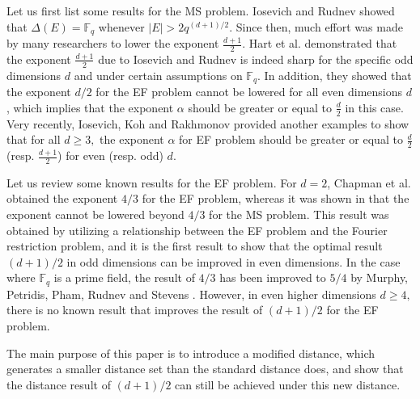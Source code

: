 \documentclass[a4paper,11pt]{amsart}
\numberwithin{equation}{section}
\begin{document}
Let us first list some results for the MS problem. Iosevich and Rudnev \cite{IR07} showed that $ \Delta(E) = \mathbb{F}_q $  whenever $ |E| > 2q^{(d+1)/2}$. Since then, much effort was made by many researchers to lower the exponent $\frac{d+1}{2}$. Hart et al. \cite{HIKR10} demonstrated that the exponent $\frac{d+1}{2}$ due to Iosevich and Rudnev \cite{IR07} is indeed sharp for the specific odd dimensions $d$ and under certain assumptions on $\mathbb F_q$.  In addition, they showed that  the exponent $d/2$ for the EF problem cannot be lowered for all even dimensions $d$, which implies that the exponent $\alpha$ should be greater or equal to $\frac{d}{2}$ in this case. Very recently, Iosevich, Koh and Rakhmonov \cite{FIK24} provided another examples to show that for all $d\geq 3,$ the exponent $\alpha$ for EF problem should be greater or equal to $\frac{d}{2}$ (resp. $\frac{d+1}{2}$) for even (resp. odd) $d.$

Let us review some known results for the EF problem. For $d=2$, Chapman et al. \cite{CEHIK10} obtained the exponent $ 4/3 $ for the EF problem, whereas it was shown in \cite{MP19} that the exponent cannot be lowered beyond $4/3$ for the MS problem. This result was obtained by utilizing a relationship between the EF problem and the Fourier restriction problem, and it is the first result to show that the optimal result $(d+1)/2$ in odd dimensions can be improved in even dimensions. In the case where $\mathbb F_q$ is a prime field, the result of $4/3$ has been improved to $5/4$ by Murphy,  Petridis,  Pham,  Rudnev and  Stevens \cite{MPPRS20}. However, in even higher dimensions $d\ge 4,$ there is no known result that improves the result of $(d+1)/2$  for the EF problem.  

The main purpose of this paper is to introduce a modified distance, which generates a smaller distance set than the standard distance does, and show that the distance result of \((d+1)/2\) can still be achieved under this new distance.
\end{document}

